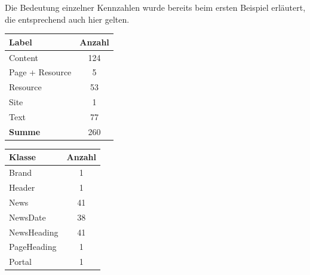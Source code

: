     Die Bedeutung einzelner Kennzahlen wurde bereits beim ersten Beispiel erläutert,
    die entsprechend auch hier gelten.

    \begin{table}[htb]
        \begin{subtable}[c]{0.3\textwidth}
            \centering
            \begin{tabular}{|l|c|}
                \hline
                \textbf{Label}  & \multicolumn{1}{l|}{\textbf{Anzahl}} \\ \hline
                Content         & 124                                  \\ \hline
                Page + Resource & 5                                    \\ \hline
                Resource        & 53                                   \\ \hline
                Site            & 1                                    \\ \hline
                Text            & 77                                   \\ \hline
                \hline
                \textbf{Summe}  & 260                                  \\ \hline
            \end{tabular}
            \label{table:findingsNewsFiguresNodesByLabel}
        \end{subtable}
        \begin{subtable}[c]{0.3\textwidth}
            \centering
            \begin{tabular}{|l|c|}
                \hline
                \textbf{Klasse} & \multicolumn{1}{l|}{\textbf{Anzahl}} \\ \hline
                Brand           & 1                                    \\ \hline
                Header          & 1                                    \\ \hline
                News            & 41                                   \\ \hline
                NewsDate        & 38                                   \\ \hline
                NewsHeading     & 41                                   \\ \hline
                PageHeading     & 1                                    \\ \hline
                Portal          & 1                                    \\ \hline

\end{tabular}
\end{subtable}
\end{table}
